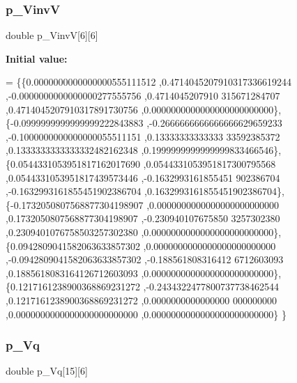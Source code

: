 \subsubsection{\texorpdfstring{p\+\_\+\+VinvV}{p\_VinvV}}
{\footnotesize\ttfamily double p\+\_\+\+VinvV\mbox{[}6\mbox{]}\mbox{[}6\mbox{]}}

{\bfseries Initial value\+:}
\begin{DoxyCode}
= \{\{0.0000000000000000555111512 ,0.4714045207910317336619244 ,-0.0000000000000000277555756 ,0.4714045207910
      315671284707 ,0.4714045207910317891730756 ,0.0000000000000000000000000\},
\{-0.0999999999999999222843883 ,-0.2666666666666666629659233 ,-0.1000000000000000055511151 ,0.13333333333333
      33592385372 ,0.1333333333333332482162348 ,0.1999999999999999833466546\},
\{0.0544331053951817162017690 ,0.0544331053951817300795568 ,0.0544331053951817439573446 ,-0.1632993161855451
      902386704 ,-0.1632993161855451902386704 ,0.1632993161855451902386704\},
\{-0.1732050807568877304198907 ,0.0000000000000000000000000 ,0.1732050807568877304198907 ,-0.230940107675850
      3257302380 ,0.2309401076758503257302380 ,0.0000000000000000000000000\},
\{0.0942809041582063633857302 ,0.0000000000000000000000000 ,-0.0942809041582063633857302 ,-0.188561808316412
      6712603093 ,0.1885618083164126712603093 ,0.0000000000000000000000000\},
\{0.1217161238900368869231272 ,-0.2434322477800737738462544 ,0.1217161238900368869231272 ,0.0000000000000000
      000000000 ,0.0000000000000000000000000 ,0.0000000000000000000000000\}
\}
\end{DoxyCode}
\mbox{\label{a00449_abdc90e0c71b87216348efe8692da8dfb}} 
\subsubsection{\texorpdfstring{p\+\_\+\+Vq}{p\_Vq}}
{\footnotesize\ttfamily double p\+\_\+\+Vq\mbox{[}15\mbox{]}\mbox{[}6\mbox{]}}

